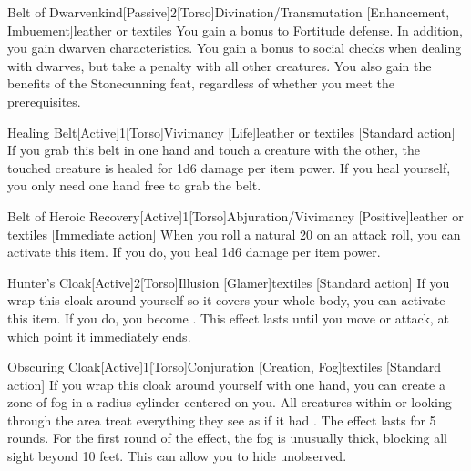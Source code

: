         \begin{magicitemdef}{Belt of Dwarvenkind}[Passive]{2}[Torso]{Divination/Transmutation [Enhancement, Imbuement]}{leather or textiles}
             You gain a  bonus to Fortitude defense.
            In addition, you gain dwarven characteristics.
            You gain a  bonus to social checks when dealing with dwarves, but take a  penalty with all other creatures.
            You also gain the benefits of the Stonecunning feat, regardless of whether you meet the prerequisites.
        \end{magicitemdef}

        \begin{magicitemdef}{Healing Belt}[Active]{1}[Torso]{Vivimancy [Life]}{leather or textiles}
            [Standard action] If you grab this belt in one hand and touch a creature with the other, the touched creature is healed for 1d6 damage per item power.
            If you heal yourself, you only need one hand free to grab the belt.
        \end{magicitemdef}

        \begin{magicitemdef}{Belt of Heroic Recovery}[Active]{1}[Torso]{Abjuration/Vivimancy [Positive]}{leather or textiles}
            [Immediate action] When you roll a natural 20 on an attack roll, you can activate this item. If you do, you heal 1d6 damage per item power.
        \end{magicitemdef}

        \begin{magicitemdef}{Hunter's Cloak}[Active]{2}[Torso]{Illusion [Glamer]}{textiles}
            [Standard action] If you wrap this cloak around yourself so it covers your whole body, you can activate this item.
            If you do, you become .
            This effect lasts until you move or attack, at which point it immediately ends.
        \end{magicitemdef}

        \begin{magicitemdef}{Obscuring Cloak}[Active]{1}[Torso]{Conjuration [Creation, Fog]}{textiles}
            [Standard action] If you wrap this cloak around yourself with one hand, you can create a zone of fog in a \areamed radius cylinder centered on you.
            All creatures within or looking through the area treat everything they see as if it had \concealment.
            The effect lasts for 5 rounds.
            For the first round of the effect, the fog is unusually thick, blocking all sight beyond 10 feet.
            This can allow you to hide unobserved.
        \end{magicitemdef}

